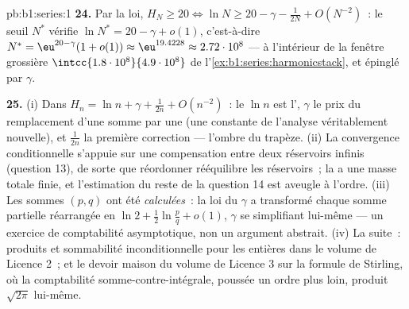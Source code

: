\begin{solution}{pb:b1:series:1}
\textbf{24.} Par la loi, $H_N \geq 20 \iff \ln N \geq 20 -
\gamma - \frac{1}{2N} + O(N^{-2})$~: le seuil $N^*$ vérifie
$\ln N^* = 20 - \gamma + o(1)$, c'est-à-dire $N^* =
\eu^{20 - \gamma}(1 + o(1)) \approx \eu^{19.4228} \approx
2.72\cdot10^{8}$ --- à l'intérieur de la fenêtre grossière
$\intcc{1.8\cdot10^8}{4.9\cdot10^8}$ de
l'\cref{ex:b1:series:harmonicstack}, et épinglé par $\gamma$.

\textbf{25.} (i) Dans $H_n = \ln n + \gamma + \frac{1}{2n} +
O(n^{-2})$~: le $\ln n$ est l', $\gamma$ le prix du
remplacement d'une somme par une  (une constante de
l'analyse véritablement nouvelle), et $\frac{1}{2n}$ la première
correction --- l'ombre du trapèze. (ii) La convergence conditionnelle
s'appuie sur une compensation entre deux réservoirs infinis (question
13), de sorte que réordonner rééquilibre les réservoirs~; la
 a une masse totale finie, et l'estimation du
reste de la question 14 est aveugle à l'ordre. (iii) Les sommes
$(p,q)$ ont été \emph{calculées}~: la loi du $\gamma$ a transformé
chaque somme partielle réarrangée en $\ln 2 +
\frac12\ln\frac pq + o(1)$, $\gamma$ se simplifiant lui-même ---
un exercice de comptabilité asymptotique, non un argument abstrait.
(iv) La suite~: produits et sommabilité inconditionnelle pour les
 entières dans le volume de Licence 2~; et le devoir maison du
volume de Licence 3 sur la formule de Stirling, où la comptabilité
somme-contre-intégrale, poussée un ordre plus loin, produit
$\sqrt{2\pi}$ lui-même.
\end{solution}
